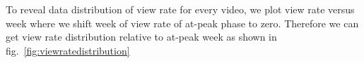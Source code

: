 \documentclass[10pt,final,journal,a4paper]{IEEEtran}
\begin{document}
To reveal data distribution of view rate for every video, we plot view rate versus week where we shift week of view rate of at-peak phase to zero. 
Therefore we can get view rate distribution relative to at-peak week as shown in fig.~\ref{fig:viewratedistribution}



\end{document}

